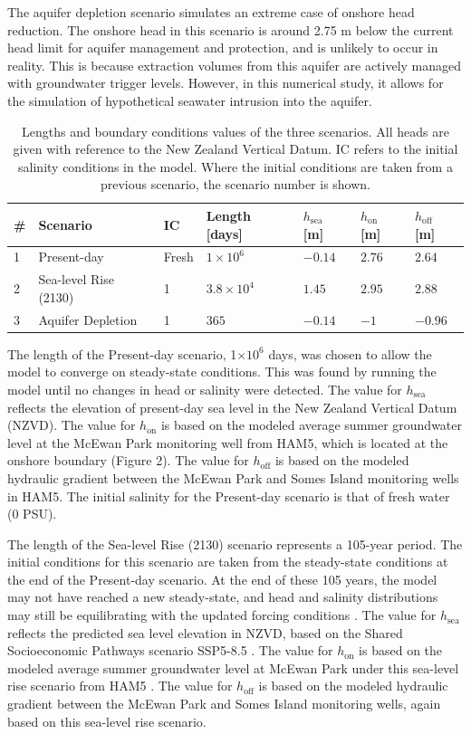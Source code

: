\documentclass[draft, 10pt]{agujournal2019}
\begin{document}
The aquifer depletion scenario simulates an extreme case of onshore head reduction.
The onshore head in this scenario is around 2.75 m below the current head limit for aquifer management and protection, and is unlikely to occur in reality.
This is because extraction volumes from this aquifer are actively managed with groundwater trigger levels.
However, in this numerical study, it allows for the simulation of hypothetical seawater intrusion into the aquifer.


\begin{table}[h!]
\centering
\caption{Lengths and boundary conditions values of the three scenarios. All heads are given with reference to the New Zealand Vertical Datum. IC refers to the initial salinity conditions in the model. Where the initial conditions are taken from a previous scenario, the scenario number is shown.}
\begin{tabular}{lllllll}
\hline
\# & Scenario & IC &Length [days] & $h_{\mathrm{sea}}$ [m] & $h_{\mathrm{on}}$ [m] & $h_{\mathrm{off}}$ [m] \\
\hline
1 & Present-day & Fresh & $1\times 10^{6}$& $-0.14$  & $2.76$ & $2.64$\\
2 & Sea-level Rise (2130) & 1 & $3.8\times 10^{4}$ & $1.45$  & $2.95$ & $2.88$\\ 
3 & Aquifer Depletion & 1 & $365$& $-0.14$  & $-1$ & $-0.96$\\
\hline
\end{tabular}
\label{tab:table_stages}
\end{table}

The length of the Present-day scenario, 1$\times10^6$ days, was chosen to allow the model to converge on steady-state conditions.
This was found by running the model until no changes in head or salinity were detected.
The value for $h_{\mathrm{sea}}$ reflects the elevation of present-day sea level in the New Zealand Vertical Datum (NZVD).
The value for $h_{\mathrm{on}}$ is based on the modeled average summer groundwater level at the McEwan Park monitoring well from HAM5, which is located at the onshore boundary (Figure 2).
The value for $h_{\mathrm{off}}$ is based on the modeled hydraulic gradient between the McEwan Park and Somes Island monitoring wells in HAM5.
The initial salinity for the Present-day scenario is that of fresh water (0 PSU).

The length of the Sea-level Rise (2130) scenario represents a 105-year period.
The initial conditions for this scenario are taken from the steady-state conditions at the end of the Present-day scenario.
At the end of these 105 years, the model may not have reached a new steady-state, and head and salinity distributions may still be equilibrating with the updated forcing conditions \cite{lu_timescales_2013}.
The value for $h_{\mathrm{sea}}$ reflects the predicted sea level elevation in NZVD, based on the Shared Socioeconomic Pathways scenario SSP5-8.5 \cite{nzsearise_takiwa_2023}.
The value for $h_{\mathrm{on}}$ is based on the modeled average summer groundwater level at McEwan Park under this sea-level rise scenario from HAM5 \cite{bennett_hutt_2024}.
The value for $h_{\mathrm{off}}$ is based on the modeled hydraulic gradient between the McEwan Park and Somes Island monitoring wells, again based on this sea-level rise scenario.
\end{document}
